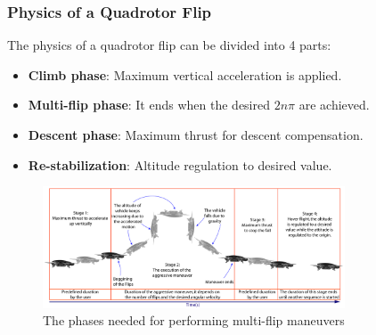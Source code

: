 \documentclass{thesisbeamer}
\newcommand\Fontvi{\fontsize{9}{10}\selectfont}
\begin{document}
\begin{frame}
	\frametitle{Physics of a Quadrotor Flip}
	\Fontvi
	
	The physics of a quadrotor flip can be divided into 4 parts:

	\begin{itemize}%
		\item \textbf{Climb phase}: Maximum vertical acceleration is applied.
		\item \textbf{Multi-flip phase}: It ends when the desired $2n\pi$ are achieved.
		\item \textbf{Descent phase}: Maximum thrust for descent compensation.
		\item \textbf{Re-stabilization}: Altitude regulation to desired value. 
	\end{itemize}

	\begin{figure}[h]
		\centering
		\includegraphics[width=0.8\textwidth]{Images/Flip/Physics}
		\caption{The phases needed for performing multi-flip maneuvers \protect\footnotemark}
		\label{flipping_physics}
	\end{figure}


\end{frame}
\end{document}
